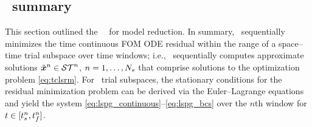 



\subsection{\methodAcronym\ summary}
This section outlined the \methodAcronym\ \approachKwd\ for model reduction. In
summary, \methodAcronym\ sequentially minimizes the time continuous FOM ODE
residual within the range of a space--time trial subspace over time
windows; i.e.,  
\methodAcronym\ sequentially computes approximate solutions
$\tilde{\boldsymbol x}^{n}\in\mathcal{ ST }^n$, $n=1,\ldots,N_s$ that comprise
solutions to the optimization problem \eqref{eq:tclsrm}.
For \spatialAcronym\ trial subspaces, the stationary conditions for the
residual minimization problem can be derived via the Euler--Lagrange equations
and yield the system \eqref{eq:lspg_continuous}--\eqref{eq:lspg_bcs} over the $n$th window for $t \in
[t_s^{n},t_f^{n}]$.
